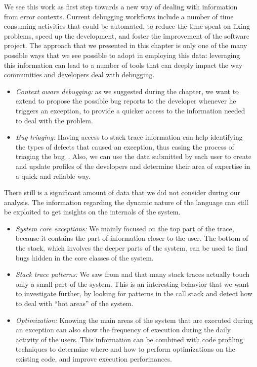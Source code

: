 We see this work as first step towards a new way of dealing with information from error contexts.
Current debugging workflows include a number of time consuming activities that could be automated, to reduce the time spent on fixing problems, speed up the development, and foster the improvement of the software project.
The approach that we presented in this chapter is only one of the many possible ways that we see possible to adopt in employing this data: leveraging this information can lead to a number of tools that can deeply impact the way communities and developers deal with debugging.
\begin{itemize}%
\item\textit{Context aware debugging:} as we suggested during the chapter, we want to extend \slr to propose the possible bug reports to the developer whenever he triggers an exception, to provide a quicker access to the information needed to deal with the problem.

\item\textit{Bug triaging:} Having access to stack trace information can help identifying the types of defects that caused an exception, thus easing the process of triaging the bug~\cite{Anvi2006a}.
Also, we can use the data submitted by each user to create and update profiles of the developers and determine their area of expertise in a quick and reliable way.

\end{itemize}

There still is a significant amount of data that we did not consider during our analysis.
The information regarding the dynamic nature of the language can still be exploited to get insights on the internals of the system.

\begin{itemize}%

\item\textit{System core exceptions:} We mainly focused on the top part of the trace, because it contains the part of information closer to the user.
The bottom of the stack, which involves the deeper parts of the system, can be used to find bugs hidden in the core classes of the system.

\item\textit{Stack trace patterns:} We saw from  and  that many stack traces actually touch only a small part of the system.
This is an interesting behavior that we want to investigate further, by looking for patterns in the call stack and detect how to deal with ``hot areas'' of the system.

\item\textit{Optimization:} Knowing the main areas of the system that are executed during an exception can also show the frequency of execution during the daily activity of the users.
This information can be combined with code profiling techniques to determine where and how to perform optimizations on the existing code, and improve execution performances.
\end{itemize}

